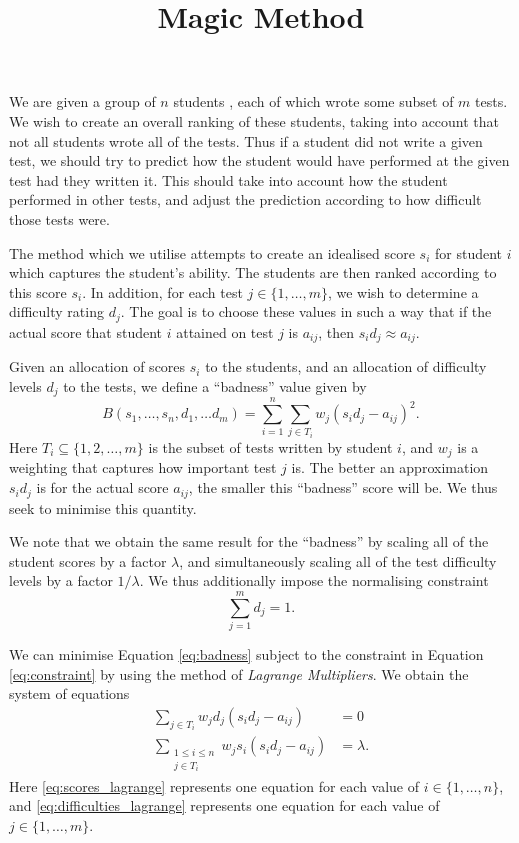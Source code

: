 \documentclass{article}
\title{Magic Method}
\author{}
\date{}
\begin{document}
\maketitle

We are given a group of $n$ students , each of which wrote some subset of $m$ tests. We wish to create an overall ranking of these students, taking into account that not all students wrote all of the tests. Thus if a student did not write a given test, we should try to predict how the student would have performed at the given test had they written it. This should take into account how the student performed in other tests, and adjust the prediction according to how difficult those tests were.

The method which we utilise attempts to create an idealised score $s_i$ for student $i$ which captures the student's ability. The students are then ranked according to this score $s_i$. In addition, for each test $j \in \{1, \dots, m\}$, we wish to determine a difficulty rating $d_j$. The goal is to choose these values in such a way that if the actual score that student $i$ attained on test $j$ is $a_{ij}$, then $s_i d_j \approx a_{ij}$.

Given an allocation of scores $s_i$ to the students, and an allocation of difficulty levels $d_j$ to the tests, we define a ``badness'' value given by
\begin{equation}
\label{eq:badness}
    B(s_1, \dots, s_n, d_1, \dots d_m) = \sum_{i=1}^{n} \sum_{j \in T_i} w_j (s_i d_j - a_{ij})^2.
\end{equation}
Here $T_i \subseteq \{1, 2, \dots, m\}$ is the subset of tests written by student $i$, and $w_j$ is a weighting that captures how important test $j$ is.
The better an approximation $s_i d_j$ is for the actual score $a_{ij}$, the smaller this ``badness'' score will be. We thus seek to minimise this quantity.

We note that we obtain the same result for the ``badness'' by scaling all of the student scores by a factor $\lambda$, and simultaneously scaling all of the test difficulty levels by a factor $1/\lambda$. We thus additionally impose the normalising constraint
\begin{equation}
\label{eq:constraint}
    \sum_{j=1}^{m} d_j = 1.
\end{equation}

We can minimise Equation \ref{eq:badness} subject to the constraint in Equation \ref{eq:constraint} by using the method of \emph{Lagrange Multipliers}. We obtain the system of equations
\begin{align}
    \sum_{j \in T_i} w_j d_j (s_i d_j - a_{ij}) & = 0 \label{eq:scores_lagrange}\\
    \sum_{\substack{1 \leq i \leq n\\ j \in T_i}} w_j s_i (s_i d_j - a_{ij}) & = \lambda.\label{eq:difficulties_lagrange}
\end{align}
Here \ref{eq:scores_lagrange} represents one equation for each value of $i \in \{1, \dots, n\}$, and \ref{eq:difficulties_lagrange} represents one equation for each value of $j \in \{1, \dots, m\}$.
\end{document}
